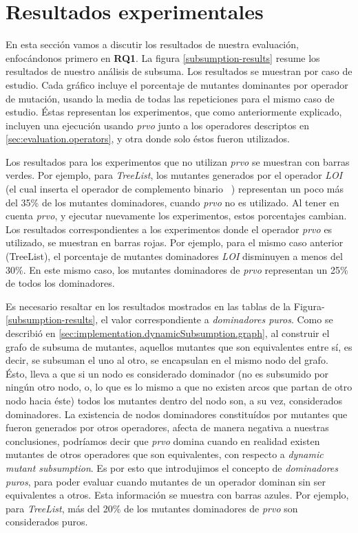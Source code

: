 \section{Resultados experimentales}
\label{sec:evaluation.results}

En esta secci\'on vamos a discutir los resultados de nuestra evaluaci\'on, enfoc\'andonos primero en \textbf{RQ1}. La figura \ref{subsumption-results} resume los resultados de nuestro an\'alisis de subsuma. Los resultados se muestran por caso de estudio. Cada gr\'afico incluye el porcentaje de mutantes dominantes por operador de mutaci\'on, usando la media de todas las repeticiones para el mismo caso de estudio. \'Estas representan los experimentos, que como anteriormente explicado, incluyen una ejecuci\'on usando \emph{prvo} junto a los operadores descriptos en \ref{sec:evaluation.operators}, y otra donde solo \'estos fueron utilizados.

Los resultados para los experimentos que no utilizan \emph{prvo} se muestran con barras verdes. Por ejemplo, para \emph{TreeList}, los mutantes generados por el operador \emph{LOI} (el cual inserta el operador de complemento binario \emph{~}) representan un poco m\'as del 35\% de los mutantes dominadores, cuando \emph{prvo} no es utilizado. Al tener en cuenta \emph{prvo}, y ejecutar nuevamente los experimentos, estos porcentajes cambian. Los resultados correspondientes a los experimentos donde el operador \emph{prvo} es utilizado, se muestran en barras rojas. Por ejemplo, para el mismo caso anterior (TreeList), el porcentaje de mutantes dominadores \emph{LOI} disminuyen a menos del 30\%. En este mismo caso, los mutantes dominadores de \emph{prvo} representan un 25\% de todos los dominadores.

Es necesario resaltar en los resultados mostrados en las tablas de la Figura-\ref{subsumption-results}, el valor correspondiente a \emph{dominadores puros}. Como se describi\'o en \ref{sec:implementation.dynamicSubsumption.graph}, al construir el grafo de subsuma de mutantes, aquellos mutantes que son equivalentes entre s\'i, es decir, se subsuman el uno al otro, se encapsulan en el mismo nodo del grafo. \'Esto, lleva a que si un nodo es considerado dominador (no es subsumido por ning\'un otro nodo, o, lo que es lo mismo a que no existen arcos que partan de otro nodo hacia \'este) todos los mutantes dentro del nodo son, a su vez, considerados dominadores. La existencia de nodos dominadores constitu\'idos por mutantes que fueron generados por otros operadores, afecta de manera negativa a nuestras conclusiones, podr\'iamos decir que \emph{prvo} domina cuando en realidad existen mutantes de otros operadores que son equivalentes, con respecto a \emph{dynamic mutant subsumption}. Es por esto que introdujimos el concepto de \emph{dominadores puros}, para poder evaluar cuando mutantes de un operador dominan sin ser equivalentes a otros. Esta informaci\'on se muestra con barras azules. Por ejemplo, para \emph{TreeList}, m\'as del 20\% de los mutantes dominadores de \emph{prvo} son considerados puros.

